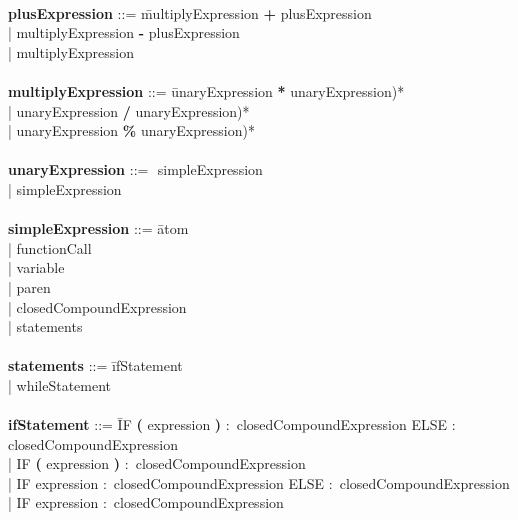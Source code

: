 \begin{tabbing}
\\ 
{\bf plusExpression}              ::= \=multiplyExpression \textbf{+} plusExpression\\
                                      \>| multiplyExpression \textbf{-} plusExpression\\
                                      \>| multiplyExpression\\
\\
{\bf multiplyExpression}          ::= \=unaryExpression \textbf{*} unaryExpression)*\\
                                      \>| unaryExpression \textbf{/} unaryExpression)*\\
                                      \>| unaryExpression \textbf{\%} unaryExpression)*\\
\\
{\bf unaryExpression}             ::= \=\textbf{$\!$} simpleExpression\\
                                      \>| simpleExpression\\ 
\\   
{\bf simpleExpression}            ::= \=atom\\
                                      \>| functionCall\\
                                      \>| variable\\
                                      \>| paren\\
                                      \>| closedCompoundExpression\\
                                      \>| statements\\
\\
{\bf statements}                  ::= \=ifStatement\\
                                      \>| whileStatement\\
\\
{\bf ifStatement}                 ::= \=IF \=\textbf{(} expression \textbf{)} $\colon$ closedCompoundExpression ELSE $\colon$ closedCompoundExpression\\
                                      \>| IF \textbf{(} expression \textbf{)} $\colon$ closedCompoundExpression\\
                                      \>| IF expression $\colon$ closedCompoundExpression ELSE $\colon$ closedCompoundExpression\\
                                      \>| IF expression $\colon$ closedCompoundExpression\\

\end{tabbing}
